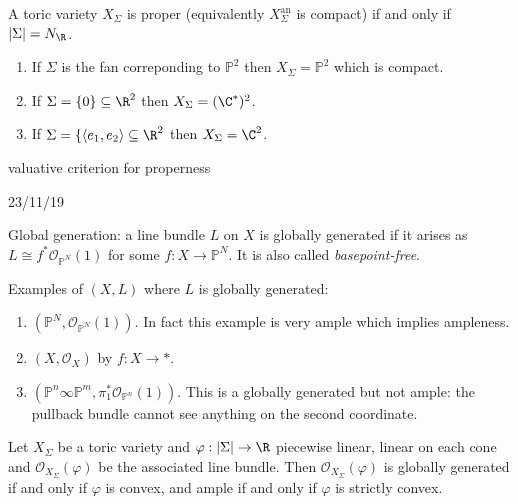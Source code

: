 \documentclass[a4paper]{article}
\renewcommand*{\P}{\mathbb{P}}
\newcommand{\sh}[1]{\mathcal{#1}} %
\begin{document}
\begin{proposition}
  A toric variety \(X_\Sigma\) is proper (equivalently \(X_\Sigma^{\text{an}}\) is compact) if and only if \(|\Sigma| = N_\R\).
\end{proposition}

\begin{eg}\leavevmode
  \begin{enumerate}
  \item If \(\Sigma\) is the fan correponding to \(\P^2\) then \(X_\Sigma = \P^2\) which is compact.
  \item If \(\Sigma = \{0\} \subseteq \R^2\) then \(X_\Sigma = (\C^*)^2\).
  \item If \(\Sigma = \{\langle e_1, e_ 2\rangle \subseteq \R^2\) then \(X_\Sigma = \C^2\).
  \end{enumerate}
\end{eg}

valuative criterion for properness

23/11/19

Global generation: a line bundle \(L\) on \(X\) is globally generated if it arises as \(L \cong f^* \sh O_{\P^N}(1)\) for some \(f: X \to \P^N\). It is also called \emph{basepoint-free}.

\begin{eg}
  Examples of \((X, L)\) where \(L\) is globally generated:
  \begin{enumerate}
  \item \((\P^N, \sh O_{\P^N}(1))\). In fact this example is very ample which implies ampleness.
  \item \((X, \sh O_X)\) by \(f: X \to *\).
  \item \((\P^n \infty \P^m, \pi_1^* \sh O_{\P^n}(1))\). This is a globally generated but not ample: the pullback bundle cannot see anything on the second coordinate.
  \end{enumerate}
\end{eg}

\begin{proposition}
  Let \(X_\Sigma\) be a toric variety and \(\varphi: |\Sigma| \to \R\) piecewise linear, linear on each cone and \(\sh O_{X_\Sigma}(\varphi)\) be the associated line bundle. Then \(\sh O_{X_\Sigma}(\varphi)\) is globally generated if and only if \(\varphi\) is convex, and ample if and only if \(\varphi\) is strictly convex.
\end{proposition}
\end{document}
